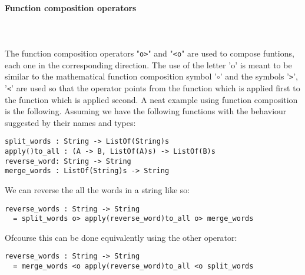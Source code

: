 \documentclass{article}
\def\pend{\mbox{} \\\\}
\begin{document}
\paragraph{Function composition operators}\pend
The function composition operators "\texttt{o>}" and "\texttt{<o}" are used to 
compose funtions, each one in the corresponding direction. The use of the letter 'o'
is meant to be similar to the mathematical function composition symbol '\(\circ\)'
and the symbols '\texttt{>}', '\texttt{<}' are used so that the operator points from
the function which is applied first to the function which is applied second.
A neat example using function composition is the following. Assuming we have the
following functions with the behaviour suggested by their names and types: 
\begin{verbatim}
split_words : String -> ListOf(String)s
apply()to_all : (A -> B, ListOf(A)s) -> ListOf(B)s
reverse_word: String -> String
merge_words : ListOf(String)s -> String
\end{verbatim}
We can reverse the all the words in a string like so:
\begin{verbatim}
reverse_words : String -> String
  = split_words o> apply(reverse_word)to_all o> merge_words
\end{verbatim}
Ofcourse this can be done equivalently using the other operator:
\begin{verbatim}
reverse_words : String -> String
  = merge_words <o apply(reverse_word)to_all <o split_words
\end{verbatim}
\end{document}
